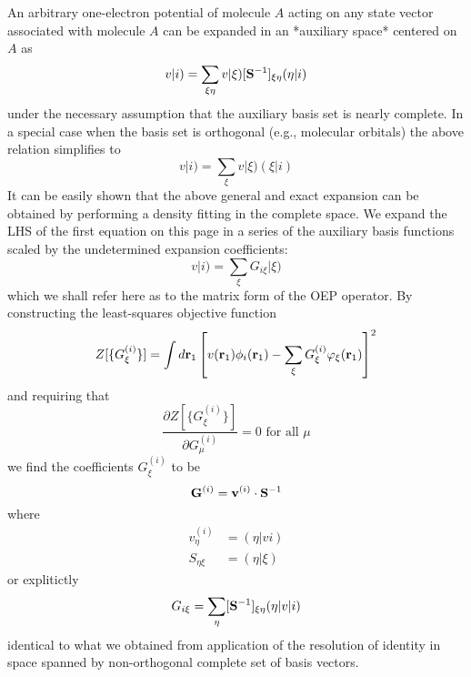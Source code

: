 An arbitrary one-electron potential of molecule $A$ acting on any state vector 
associated with molecule $A$ can be expanded in an *auxiliary space* centered 
on $A$ as
\begin{equation}
   v\vert i) = \sum_{\xi\eta} v\vert \xi) [{\bf S}^{-1}]_{\xi\eta} ( \eta \vert i)
\end{equation}
under the necessary assumption that the auxiliary basis set is nearly complete.
In a special case when the basis set is orthogonal (e.g., molecular orbitals)
the above relation simplifies to
\begin{equation}
   v\vert i) = \sum_{\xi} v\vert \xi) ( \xi \vert i)
\end{equation}
It can be easily shown that the above general and exact expansion can be obtained by 
performing a density fitting in the complete space. We expand the LHS of the first equation 
on this page in a series of the auxiliary basis functions scaled by the undetermined expansion coefficients:
\begin{equation}
  v\vert i) = \sum_{\xi} {G_{i\xi}} \vert \xi)
\end{equation}
which we shall refer here as to the matrix form of the OEP operator.
By constructing the least-squares objective function 
\begin{equation}
 Z[\{G^{(i)}_\xi\}] = \int d{\bf r}_1
                     \left[    v({\bf r}_1) \phi_i({\bf r}_1) - \sum_\xi G^{(i)}_\xi \varphi_\xi({\bf r}_1) \right]^2
\end{equation}
and requiring that
\begin{equation}
 \frac{\partial Z[\{G^{(i)}_\xi\}]}{\partial G^{(i)}_\mu} = 0 \text{ for all $\mu$}
\end{equation}
we find the coefficients $ G^{(i)}_\xi $ to be
\begin{equation}
 {\bf G}^{(i)} = {\bf v}^{(i)} \cdot {\bf S}^{-1}
\end{equation}
where
\begin{align}
 v^{(i)}_\eta &= (\eta \vert vi) \\
 S_{\eta\xi}  &= (\eta \vert \xi)
\end{align}
or explitictly
\begin{equation}
  {G_{i\xi}} = \sum_\eta [{\bf S}^{-1}]_{\xi\eta} (\eta\vert v\vert i)
\end{equation}
identical to what we obtained from application of the resolution of identity 
in space spanned by non-orthogonal complete set of basis vectors.

